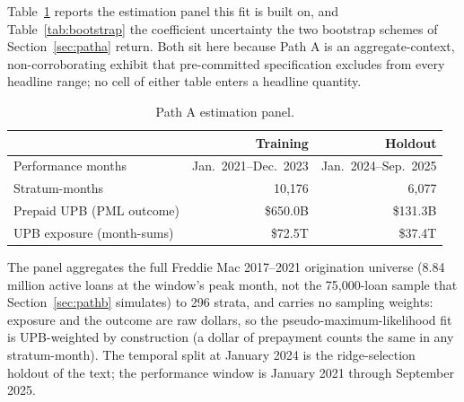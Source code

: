 \documentclass[12pt]{article}
\begin{document}
Table~\ref{tab:panel} reports the estimation panel this fit is built on, and Table~\ref{tab:bootstrap} the coefficient uncertainty the two bootstrap schemes of Section~\ref{sec:patha} return. Both sit here because Path A is an aggregate-context, non-corroborating exhibit that pre-committed specification excludes from every headline range; no cell of either table enters a headline quantity.

\begin{table}[H]
\centering
\small
\begin{threeparttable}
\caption{Path A estimation panel.}
\label{tab:panel}
\begin{tabular}{@{}lrr@{}}
\toprule
 & Training & Holdout \\
\midrule
Performance months & Jan.\ 2021--Dec.\ 2023 & Jan.\ 2024--Sep.\ 2025 \\
Stratum-months & 10,176 & 6,077 \\
Prepaid UPB (PML outcome) & \$650.0B & \$131.3B \\
UPB exposure (month-sums) & \$72.5T & \$37.4T \\
\bottomrule
\end{tabular}
\begin{tablenotes}[flushleft]\footnotesize
\item The panel aggregates the full Freddie Mac 2017--2021 origination universe (8.84 million active loans at the window's peak month, not the 75,000-loan sample that Section~\ref{sec:pathb} simulates) to 296 strata, and carries no sampling weights: exposure and the outcome are raw dollars, so the pseudo-maximum-likelihood fit is UPB-weighted by construction (a dollar of prepayment counts the same in any stratum-month). The temporal split at January 2024 is the ridge-selection holdout of the text; the performance window is January 2021 through September 2025.
\end{tablenotes}
\end{threeparttable}
\end{table}
\end{document}
